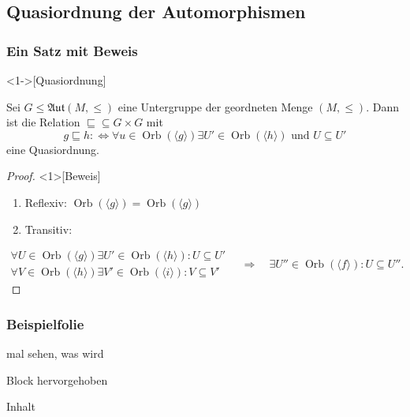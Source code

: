 \documentclass[presentation,t]{beamer}
\DeclareMathOperator\Orb{Orb}%
\begin{document}
\subsection{Quasiordnung der Automorphismen}
\label{sec-3-1}
\begin{frame}
\frametitle{Ein Satz mit Beweis}
\label{sec-3-1-1}
\begin{theorem}<1->[Quasiordnung]
\label{sec-3-1-1-1}

Sei $G\leq \mathfrak{Aut}(M,\leq)$ eine Untergruppe der geordneten
Menge $(M,\leq)$. Dann ist die Relation ${\sqsubseteq}\subseteq
G\times G$ mit 
\[
g\sqsubseteq h :\Leftrightarrow ∀u∈\Orb(〈g〉)∃U'∈\Orb(〈h〉)\text{ und }U\subseteq U'
\]
eine Quasiordnung.
\end{theorem}
\begin{proof}<1>[Beweis]
\label{sec-3-1-1-2}

\begin{enumerate}
\item Reflexiv: $\Orb(〈g〉) = \Orb(〈g〉)$
\item Transitiv:
\end{enumerate}
  \[
  \begin{matrix}∀U∈\Orb(〈g〉)∃U'∈\Orb(〈h〉): U\subseteq U'\\
    ∀V∈\Orb(〈h〉)∃V'∈\Orb(〈i〉): V\subseteq V'
  \end{matrix}\quad ⇒\quad ∃U''∈\Orb(〈f〉): U\subseteq U''.
  \]\vspace{-0.25\baselineskip}
\end{proof}
\end{frame}
\begin{frame}
\frametitle{Beispielfolie}
\label{sec-3-1-2}
\begin{example}[Beispieltitel]
\label{sec-3-1-2-1}

 mal sehen, was wird
\end{example}
\begin{alertblock}{Block hervorgehoben}
\label{sec-3-1-2-2}

Inhalt
\end{alertblock}
\end{frame}
\end{document}
